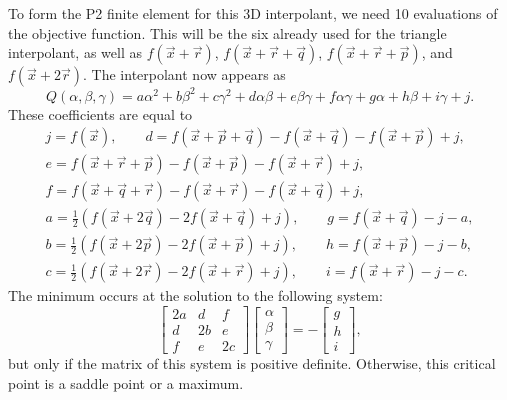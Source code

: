 \documentclass{article}
\numberwithin{equation}{section}
\begin{document}
To form the P2 finite element for this 3D interpolant, we need 10 evaluations of the objective function.
This will be the six already used for the triangle interpolant, as well as $f(\vec{x} + \vec{r})$, $f(\vec{x} + \vec{r} + \vec{q})$, $f(\vec{x} + \vec{r} + \vec{p})$, and $f(\vec{x} + 2 \vec{r})$.
The interpolant now appears as
\begin{equation*}
	Q(\alpha, \beta, \gamma) = a \alpha^2 + b \beta^2 + c \gamma^2 + d \alpha \beta + e \beta \gamma + f \alpha \gamma + g \alpha + h \beta + i \gamma + j.
\end{equation*}
These coefficients are equal to
\begin{align*}
	j = f(\vec{x}), \qquad
	d = f(\vec{x} + \vec{p} + \vec{q}) - f(\vec{x} + \vec{q}) - f(\vec{x} + \vec{p}) + j, \\
	e = f(\vec{x} + \vec{r} + \vec{p}) - f(\vec{x} + \vec{p}) - f(\vec{x} + \vec{r}) + j, \\
	f = f(\vec{x} + \vec{q} + \vec{r}) - f(\vec{x} + \vec{r}) - f(\vec{x} + \vec{q}) + j,\\
	a = \frac{1}{2} \left ( f(\vec{x} + 2 \vec{q}) - 2 f(\vec{x} + \vec{q}) + j \right ), \qquad
	g = f(\vec{x} + \vec{q}) - j - a, \\
	b = \frac{1}{2} \left ( f(\vec{x} + 2 \vec{p}) - 2 f(\vec{x} + \vec{p}) + j \right ), \qquad
	h = f(\vec{x} + \vec{p}) - j - b, \\
	c = \frac{1}{2} \left ( f(\vec{x} + 2 \vec{r}) - 2 f(\vec{x} + \vec{r}) + j \right ), \qquad
	i = f(\vec{x} + \vec{r}) - j - c.
\end{align*}
The minimum occurs at the solution to the following system:
\begin{equation*}
	\begin{bmatrix} 2a & d & f \\ d & 2b & e \\ f & e & 2c \end{bmatrix} \begin{bmatrix} \alpha \\ \beta \\ \gamma \end{bmatrix} = - \begin{bmatrix} g \\ h \\ i \end{bmatrix},
\end{equation*}
but only if the matrix of this system is positive definite.
Otherwise, this critical point is a saddle point or a maximum.
\end{document}
